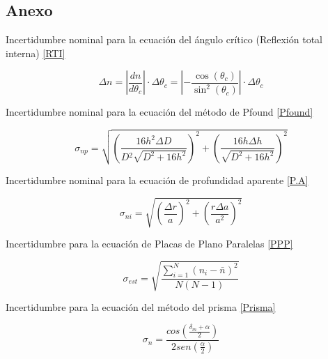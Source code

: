 \documentclass[article,12pt]{elsarticle}
\begin{document}
\subsection*{Anexo}

Incertidumbre nominal para la ecuación del ángulo crítico (Reflexión total interna) \eqref{RTI}

\begin{mdframed}
    \label{incertidumbre RTI}
\begin{equation}
    \Delta n = \left| \frac{dn}{d\theta_c} \right| \cdot \Delta \theta_c = \left| -\frac{\cos(\theta_c)}{\sin^2(\theta_c)} \right| \cdot \Delta \theta_c
\end{equation}
\end{mdframed}

Incertidumbre nominal para la ecuación del método de Pfound \eqref{Pfound}

\begin{mdframed}
 \label{incertidumbre Pfound}
    \begin{equation}
        \sigma_{np}=\sqrt{(\frac{16h^{2}\Delta D}{D{^2}\sqrt{D^{2}+16h^{2}}})^{2}+(\frac{16h \Delta h}{\sqrt{D^{2}+16h^{2}}})^{2}}
    \end{equation}
\end{mdframed}

Incertidumbre nominal para la ecuación de profundidad aparente \eqref{P.A}
\begin{mdframed}
    \label{incertidumbre P.A}
    \begin{equation}
        \sigma_{ni}= \sqrt{(\frac{\Delta r}{a})^{2}+(\frac{r\Delta a}{a^{2}})^2}
    \end{equation}
\end{mdframed}

Incertidumbre  para la ecuación de Placas de Plano Paralelas \eqref{PPP}

\begin{mdframed}
 \label{incertidumbre PPP}
 \begin{equation}
\sigma_{est}=\sqrt{\frac{\sum_{i=1}^{N}(n_i-\bar{n})^2}{N(N-1)}}
\end{equation}
   
\end{mdframed}

Incertidumbre para la ecuación del método del prisma \eqref{Prisma}

\begin{mdframed}
    \label{incertidumbre prisma}
    \begin{equation}
        \sigma_n= \frac{cos(\frac{\delta_m+\alpha}{2})}{2sen(\frac{\alpha}{2})}
    \end{equation}
\end{mdframed}
\end{document}
